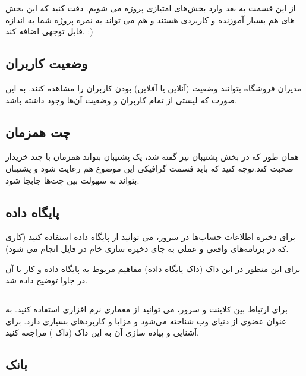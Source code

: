 \documentclass[]{article}
\begin{document}
از این قسمت به بعد وارد بخش‌های امتیازی پروژه می شویم. دقت کنید که این بخش های هم بسیار آموزنده و کاربردی هستند و هم می تواند به نمره پروژه شما به اندازه قابل توجهی اضافه کند. :)


\subsection*{{\titr وضعیت کاربران}}

مدیران فروشگاه بتوانند وضعیت (‌آنلاین یا آفلاین) بودن کاربران را مشاهده کنند. به این صورت که لیستی از تمام کاربران و وضعیت آن‌ها وجود داشته باشد.

\subsection*{{\titr چت همزمان}}

همان طور که در بخش پشتیبان نیز گفته شد،‌ یک پشتیبان بتواند همزمان با چند خریدار صحبت کند.توجه کنید که باید فسمت گرافیکی این موضوع هم رعایت شود و پشتیبان بتواند به سهولت بین چت‌ها جابجا شود.


\subsection*{{\titr پایگاه داده}}


برای ذخیره اطلاعات حساب‌ها در سرور، می توانید از پایگاه داده استفاده کنید (‌کاری که در برنامه‌های واقعی و عملی به جای ذخیره سازی خام در فایل انجام می شود).


برای این منظور در این داک (\textcolor{CustomColor}{داک پایگاه داده}) مفاهیم مربوط به پایگاه داده و کار با آن در جاوا توضیح داده شد.



\subsection*{{}}

برای ارتباط بین کلاینت و سرور،‌ می توانید از معماری نرم افزاری  استفاده کنید.  به عنوان عضوی از دنیای وب شناخته می‌شود و مزایا و کاربردهای بسیاری دارد. برای آشنایی و پیاده سازی آن به این داک (داک ) مراجعه کنید.




\subsection*{{\titr بانک}}
\end{document}
